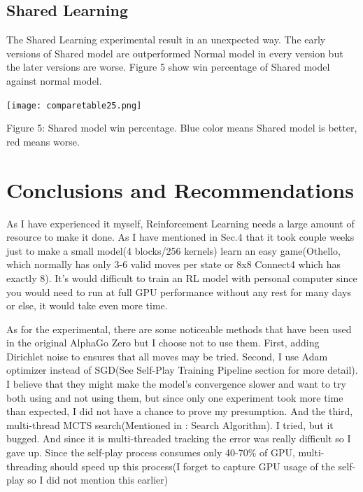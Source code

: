 \documentclass[12pt,a4paper]{article}
\begin{document}
\subsection{Shared Learning}
\hspace{0.6cm}The Shared Learning experimental result in an unexpected way. The early versions of Shared model are outperformed Normal model in every version but the later versions are worse. Figure 5 show win percentage of Shared model against normal model.
\begin{center}
\texttt{[image: comparetable25.png]}\par
\begin{small}
Figure 5: Shared model win percentage. Blue color means Shared model is better, red means worse.
\end{small}
\end{center}
\clearpage
\section{Conclusions and Recommendations}
\hspace{0.6cm}As I have experienced it myself, Reinforcement Learning needs a large amount of resource to make it done. As I have mentioned in Sec.4 that it took couple weeks just to make a small model(4 blocks/256 kernels) learn an easy game(Othello, which normally has only 3-6 valid moves per state or 8x8 Connect4 which has exactly 8). It's would difficult to train an RL model with personal computer since you would need to run at full GPU performance without any rest for many days or else, it would take even more time.\par
As for the experimental, there are some noticeable methods that have been used in the original AlphaGo Zero but I choose not to use them. First,  adding Dirichlet noise to ensures that all moves may be tried. Second, I use Adam optimizer instead of SGD(See \cite{AlphaGoZero} Self-Play Training Pipeline section for more detail). I believe that they might make the model's convergence slower and want to try both using and not using them, but since only one experiment took more time than expected, I did not have a chance to prove my presumption. And the third, multi-thread MCTS search(Mentioned in \cite{AlphaGoZero}: Search Algorithm). I tried, but it bugged. And since it is multi-threaded tracking the error was really difficult so I gave up. Since the self-play process consumes only 40-70\% of GPU, multi-threading should speed up this process(I forget to capture GPU usage of the self-play so I did not mention this earlier)\par

\clearpage


\end{document}

